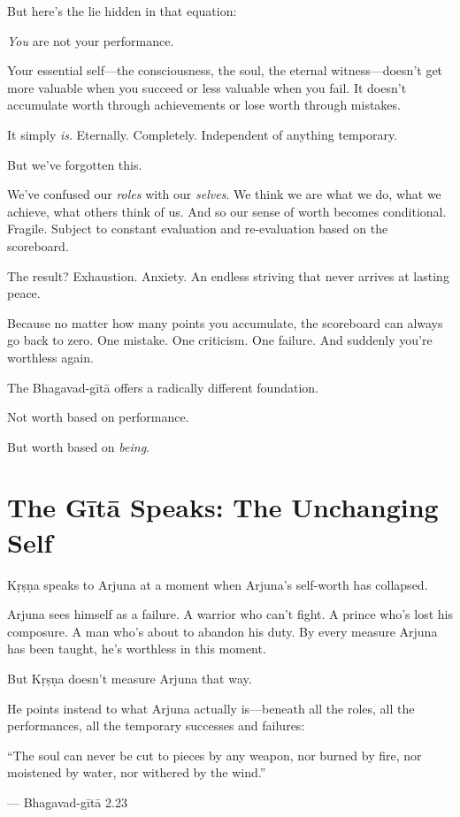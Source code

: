 \documentclass[11pt,twoside]{book}
\begin{document}
But here's the lie hidden in that equation:

\emph{You} are not your performance.

Your essential self—the consciousness, the soul, the eternal witness—doesn't get more valuable when you succeed or less valuable when you fail. It doesn't accumulate worth through achievements or lose worth through mistakes.

It simply \emph{is}. Eternally. Completely. Independent of anything temporary.

But we've forgotten this.

We've confused our \emph{roles} with our \emph{selves}. We think we are what we do, what we achieve, what others think of us. And so our sense of worth becomes conditional. Fragile. Subject to constant evaluation and re-evaluation based on the scoreboard.

The result? Exhaustion. Anxiety. An endless striving that never arrives at lasting peace.

Because no matter how many points you accumulate, the scoreboard can always go back to zero. One mistake. One criticism. One failure. And suddenly you're worthless again.

The Bhagavad-gītā offers a radically different foundation.

Not worth based on performance.

But worth based on \emph{being}.

\section*{The Gītā Speaks: The Unchanging Self}

Kṛṣṇa speaks to Arjuna at a moment when Arjuna's self-worth has collapsed.

Arjuna sees himself as a failure. A warrior who can't fight. A prince who's lost his composure. A man who's about to abandon his duty. By every measure Arjuna has been taught, he's worthless in this moment.

But Kṛṣṇa doesn't measure Arjuna that way.

He points instead to what Arjuna actually is—beneath all the roles, all the performances, all the temporary successes and failures:

\begin{pullquote}
``The soul can never be cut to pieces by any weapon, nor burned by fire, nor moistened by water, nor withered by the wind.''

--- Bhagavad-gītā 2.23
\end{pullquote}
\end{document}
